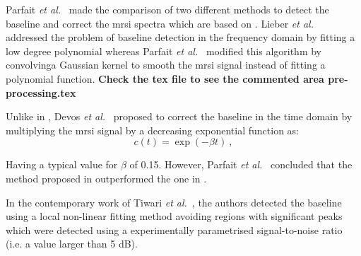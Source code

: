 \begin{enumerate}[leftmargin=*]
Parfait \textit{et al.}~\cite{Parfait2012} made the comparison of two different methods to detect the baseline and correct the \ac{mrsi} spectra which are based on \cite{Lieber2003,Devos2004}. 
Lieber \textit{et al.}~\cite{Lieber2003} addressed the problem of baseline detection in the frequency domain by fitting a low degree  polynomial whereas Parfait \textit{et al.}~\cite{Parfait2012} modified this algorithm by convolvinga Gaussian kernel to smooth the \ac{mrsi} signal instead of fitting a polynomial function.
{\color{red} \textbf{Check the tex file to see the commented area pre-processing.tex}}



Unlike in \cite{Lieber2003}, Devos \textit{et al.}~\cite{Devos2004} proposed to correct the baseline in the time domain by multiplying the \ac{mrsi} signal by a decreasing exponential function as:
\begin{equation}
	c(t) = \exp (- \beta t) \ ,
	\label{eq:devos}
\end{equation}

\noindent Having a typical value for $\beta$ of 0.15.
However, Parfait \textit{et al.}~\cite{Parfait2012} concluded that the method proposed in \cite{Lieber2003} outperformed the one in \cite{Devos2004}.

In the contemporary work of Tiwari \textit{et al.}~\cite{Tiwari2012}, the authors detected the baseline using a local non-linear fitting method avoiding regions with significant peaks which were detected using a experimentally parametrised signal-to-noise ratio (i.e. a value larger than 5 dB).



\end{enumerate}
